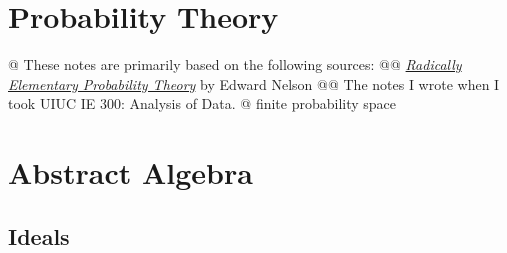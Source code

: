 \documentclass[]{article}
\newcommand{\define}[1]{\textsf{#1}}
\begin{document}
\section{Probability Theory}

\begin{easylist}[itemize]
@ These notes are primarily based on the following sources:
@@ {%
  \href{https://web.math.princeton.edu/~nelson/books/rept.pdf}{%
    \textit{Radically Elementary Probability Theory}}
  by Edward Nelson
}
@@ {%
  The notes I wrote when I took UIUC IE 300: Analysis of Data.
}
@ {%
  \define{finite probability space}
}
\end{easylist}

\section{Abstract Algebra}

\subsection{Ideals}
\end{document}
